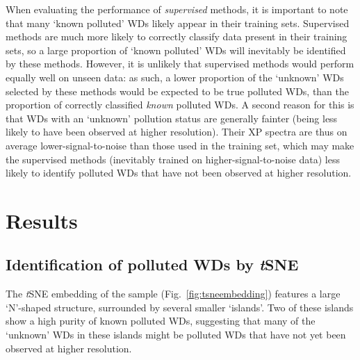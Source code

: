 \documentclass[fleqn,usenatbib]{rasti}
\begin{document}
When evaluating the performance of \textit{supervised} methods, it is important to note that many `known polluted' WDs likely appear in their training sets.
Supervised methods are much more likely to correctly classify data present in their training sets, so a large proportion of `known polluted' WDs will inevitably be identified by these methods.
However, it is unlikely that supervised methods would perform equally well on unseen data: as such, a lower proportion of the `unknown' WDs selected by these methods would be expected to be true polluted WDs, than the proportion of correctly classified \textit{known} polluted WDs.
A second reason for this is that WDs with an `unknown' pollution status are generally fainter (being less likely to have been observed at higher resolution).
Their XP spectra are thus on average lower-signal-to-noise than those used in the training set, which may make the supervised methods (inevitably trained on higher-signal-to-noise data) less likely to identify polluted WDs that have not been observed at higher resolution.


\section{Results} \label{sec:results}

\subsection{Identification of polluted WDs by \textit{t}SNE} \label{sec:results/tsne}

The \textit{t}SNE embedding of the sample (Fig.~\ref{fig:tsneembedding}) features a large `N'-shaped structure, surrounded by several smaller `islands'.
Two of these islands show a high purity of known polluted WDs, suggesting that many of the `unknown' WDs in these islands might be polluted WDs that have not yet been observed at higher resolution.
\end{document}
